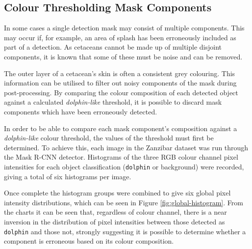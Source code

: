 \subsection{Colour Thresholding Mask Components}\label{ch:cetDet,sec:postProcessing,sub:colourThresholdingMaskComponents}

In some cases a single detection mask may consist of multiple components. This may occur if, for example, an area of splash has been erroneously included as part of a detection. As cetaceans cannot be made up of multiple disjoint components, it is known that some of these must be noise and can be removed. 

The outer layer of a cetacean's skin is often a consistent grey colouring. This information can be utilised to filter out noisy components of the mask during post-processing. By comparing the colour composition of each detected object against a calculated \textit{dolphin-like} threshold, it is possible to discard mask components which have been erroneously detected.

In order to be able to compare each mask component's composition against a \textit{dolphin-like} colour threshold, the values of the threshold must first be determined. To achieve this, each image in the Zanzibar dataset was run through the Mask R-CNN detector. Histograms of the three RGB colour channel pixel intensities for each object classification (\texttt{dolphin} or background) were recorded, giving a total of six histograms per image. 

Once complete the histogram groups were combined to give six global pixel intensity distributions, which can be seen in Figure \ref{fig:global-histogram}. From the charts it can be seen that, regardless of colour channel, there is a near inversion in the distribution of pixel intensities between those detected as \texttt{dolphin} and those not, strongly suggesting it is possible to determine whether a component is erroneous based on its colour composition.

